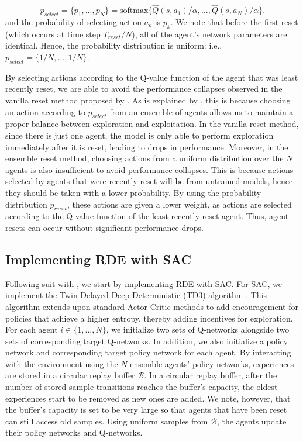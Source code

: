 \documentclass[base]{subfiles}
\begin{document}
\begin{equation}
	\label{eq:p_select}
	p_{select} = \{ p_1, ..., p_N \} = \text{softmax} \{ \hat{Q} (s, a_1) / \alpha, ..., \hat{Q} (s, a_N) / \alpha \}.
\end{equation}
and the probability of selecting action $a_k$ is $p_k$. We note that before the first reset (which occurs at time step $T_{reset} / N$), all of the agent's network parameters are identical. Hence, the probability distribution is uniform: i.e., $p_{select} = \{ 1/N, ..., 1/N \}$.

By selecting actions according to the Q-value function of the agent that was least recently reset, we are able to avoid the performance collapses observed in the vanilla reset method proposed by \cite{nikishin2022}.
As is explained by \cite{kim2023}, this is because choosing an action according to $p_{select}$ from an ensemble of agents allows us to maintain a proper balance between exploration and exploitation.
In the vanilla reset method, since there is just one agent, the model is only able to perform exploration immediately after it is reset, leading to drops in performance.
Moreover, in the ensemble reset method, choosing actions from a uniform distribution over the $N$ agents is also insufficient to avoid performance collapses.
This is because actions selected by agents that were recently reset will be from untrained models, hence they should be taken with a lower probability.
By using the probability distribution $p_{reset}$, these actions are given a lower weight, as actions are selected according to the Q-value function of the least recently reset agent.
Thus, agent resets can occur without significant performance drops.

\subsection{Implementing RDE with SAC}

Following suit with \cite{kim2023}, we start by implementing RDE with SAC.
For SAC, we implement the Twin Delayed Deep Deterministic (TD3) algorithm \cite{sac, fujimoto2018}.
This algorithm extends upon standard Actor-Critic methods to add encouragement for policies that achieve a higher entropy, thereby adding incentives for exploration.
For each agent $i \in \{1,...,N\}$, we initialize two sets of Q-networks alongside two sets of corresponding target Q-networks.
In addition, we also initialize a policy network and corresponding target policy network for each agent.
By interacting with the environment using the $N$ ensemble agents' policy networks, experiences are stored in a circular replay buffer $\mathcal{B}$.
In a circular replay buffer, after the number of stored sample transitions reaches the buffer's capacity, the oldest experiences start to be removed as new ones are added.
We note, however, that the buffer's capacity is set to be very large so that agents that have been reset can still access old samples.
Using uniform samples from $\mathcal{B}$, the agents update their policy networks and Q-networks.
\end{document}
